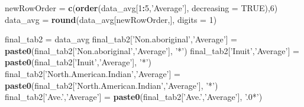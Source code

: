 \documentclass[9pt,letter]{article}
\newenvironment{Shaded}{\begin{snugshade}}{\end{snugshade}}
\newcommand{\KeywordTok}[1]{\textcolor[rgb]{0.13,0.29,0.53}{\textbf{#1}}}
\newcommand{\DataTypeTok}[1]{\textcolor[rgb]{0.13,0.29,0.53}{#1}}
\newcommand{\DecValTok}[1]{\textcolor[rgb]{0.00,0.00,0.81}{#1}}
\newcommand{\StringTok}[1]{\textcolor[rgb]{0.31,0.60,0.02}{#1}}
\newcommand{\OtherTok}[1]{\textcolor[rgb]{0.56,0.35,0.01}{#1}}
\newcommand{\OperatorTok}[1]{\textcolor[rgb]{0.81,0.36,0.00}{\textbf{#1}}}
\newcommand{\NormalTok}[1]{#1}
\begin{document}
\begin{Shaded}
\begin{Highlighting}[]
\NormalTok{newRowOrder =}\StringTok{ }\KeywordTok{c}\NormalTok{(}\KeywordTok{order}\NormalTok{(data_avg[}\DecValTok{1}\OperatorTok{:}\DecValTok{5}\NormalTok{,}\StringTok{'Average'}\NormalTok{], }\DataTypeTok{decreasing =} \OtherTok{TRUE}\NormalTok{),}\DecValTok{6}\NormalTok{)}
\NormalTok{data_avg =}\StringTok{ }\KeywordTok{round}\NormalTok{(data_avg[newRowOrder,], }\DataTypeTok{digits =} \DecValTok{1}\NormalTok{)}

\NormalTok{final_tab2 =}\StringTok{ }\NormalTok{data_avg}
\NormalTok{final_tab2[}\StringTok{'Non.aboriginal'}\NormalTok{,}\StringTok{'Average'}\NormalTok{] =}\StringTok{ }
\StringTok{  }\KeywordTok{paste0}\NormalTok{(final_tab2[}\StringTok{'Non.aboriginal'}\NormalTok{,}\StringTok{'Average'}\NormalTok{], }\StringTok{'*'}\NormalTok{)}
\NormalTok{final_tab2[}\StringTok{'Inuit'}\NormalTok{,}\StringTok{'Average'}\NormalTok{] =}\StringTok{ }
\StringTok{  }\KeywordTok{paste0}\NormalTok{(final_tab2[}\StringTok{'Inuit'}\NormalTok{,}\StringTok{'Average'}\NormalTok{], }\StringTok{'*'}\NormalTok{)}
\NormalTok{final_tab2[}\StringTok{'North.American.Indian'}\NormalTok{,}\StringTok{'Average'}\NormalTok{] =}\StringTok{ }
\StringTok{  }\KeywordTok{paste0}\NormalTok{(final_tab2[}\StringTok{'North.American.Indian'}\NormalTok{,}\StringTok{'Average'}\NormalTok{], }\StringTok{'*'}\NormalTok{)}
\NormalTok{final_tab2[}\StringTok{'Ave.'}\NormalTok{,}\StringTok{'Average'}\NormalTok{] =}\StringTok{ }
\StringTok{  }\KeywordTok{paste0}\NormalTok{(final_tab2[}\StringTok{'Ave.'}\NormalTok{,}\StringTok{'Average'}\NormalTok{], }\StringTok{'.0*'}\NormalTok{)}


\end{Highlighting}
\end{Shaded}
\end{document}
